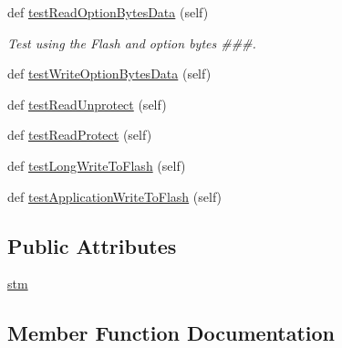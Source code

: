 \begin{DoxyCompactItemize}
\item 
def \hyperlink{classstm__tools_1_1tests_1_1stmdevice__test_1_1STMInterfaceTestCase_a62444780adc2068779a899c912837681}{test\+Read\+Option\+Bytes\+Data} (self)
\begin{DoxyCompactList}\small\item\em Test using the Flash and option bytes \#\#\#. \end{DoxyCompactList}\item 
def \hyperlink{classstm__tools_1_1tests_1_1stmdevice__test_1_1STMInterfaceTestCase_a19f0718574b25d07f4715ec0c9caad53}{test\+Write\+Option\+Bytes\+Data} (self)
\item 
def \hyperlink{classstm__tools_1_1tests_1_1stmdevice__test_1_1STMInterfaceTestCase_a18428729aed5aa4d5490942cada28264}{test\+Read\+Unprotect} (self)
\item 
def \hyperlink{classstm__tools_1_1tests_1_1stmdevice__test_1_1STMInterfaceTestCase_a709696307a75780772fda6f1c4544976}{test\+Read\+Protect} (self)
\item 
def \hyperlink{classstm__tools_1_1tests_1_1stmdevice__test_1_1STMInterfaceTestCase_aa3780a03aea7675aec22fb6dbf9af2e8}{test\+Long\+Write\+To\+Flash} (self)
\item 
def \hyperlink{classstm__tools_1_1tests_1_1stmdevice__test_1_1STMInterfaceTestCase_a69b3d280c74920034935b620de741818}{test\+Application\+Write\+To\+Flash} (self)
\end{DoxyCompactItemize}
\subsection*{Public Attributes}
\begin{DoxyCompactItemize}
\item 
\hyperlink{classstm__tools_1_1tests_1_1stmdevice__test_1_1STMInterfaceTestCase_ada855626ae0ce416b8edf41f44ab7bd5}{stm}
\end{DoxyCompactItemize}


\subsection{Member Function Documentation}
\mbox{\label{classstm__tools_1_1tests_1_1stmdevice__test_1_1STMInterfaceTestCase_a3c64ad4ffc70313fb320cbff348ca340}} 
